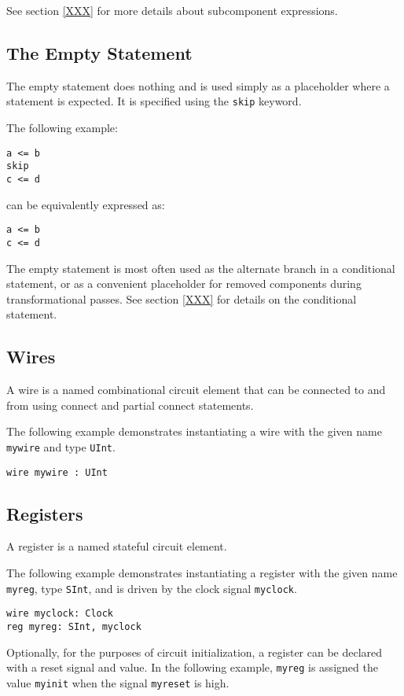 \documentclass[12pt]{article}
\begin{document}
See section \ref{XXX} for more details about subcomponent expressions.

\subsection{The Empty Statement}
The empty statement does nothing and is used simply as a placeholder where a statement is expected. It is specified using the \verb|skip| keyword.

The following example:
\begin{verbatim}
a <= b
skip
c <= d
\end{verbatim}
can be equivalently expressed as:
\begin{verbatim}
a <= b
c <= d
\end{verbatim}

The empty statement is most often used as the alternate branch in a conditional statement, or as a convenient placeholder for removed components during transformational passes. See section \ref{XXX} for details on the conditional statement.

\subsection{Wires}
A wire is a named combinational circuit element that can be connected to and from using connect and partial connect statements.

The following example demonstrates instantiating a wire with the given name \verb|mywire| and type \verb|UInt|.

\begin{verbatim}
wire mywire : UInt
\end{verbatim}

\subsection{Registers}
A register is a named stateful circuit element.

The following example demonstrates instantiating a register with the given name \verb|myreg|, type \verb|SInt|, and is driven by the clock signal \verb|myclock|. 

\begin{verbatim}
wire myclock: Clock
reg myreg: SInt, myclock
\end{verbatim}

Optionally, for the purposes of circuit initialization, a register can be declared with a reset signal and value. In the following example, \verb|myreg| is assigned the value \verb|myinit| when the signal \verb|myreset| is high.
\end{document}
